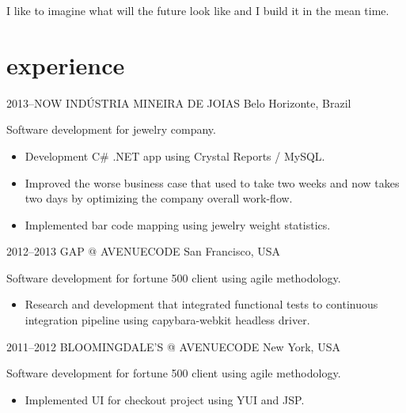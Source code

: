 \documentclass[]{friggeri-cv}
\begin{document}
I like to imagine what will the future look like and I build it in the mean time.

\section{experience}
\begin{entrylist}




\entry
{2013--NOW}
{INDÚSTRIA MINEIRA DE JOIAS}
{Belo Horizonte, Brazil}
{ Software development for jewelry company.

  \begin{itemize}
    \item Development C\# .NET app using  Crystal Reports / MySQL.
    \item Improved the worse business case that used to take two weeks and now takes two days by optimizing the company overall work-flow.
    \item Implemented bar code mapping using jewelry weight statistics.
  \end{itemize}
  }


\entry
{2012--2013}
{GAP @ AVENUECODE}
{San Francisco, USA}
{ Software development for fortune 500 client using agile methodology.
  \begin{itemize}
    \item Research and development that integrated functional tests to continuous integration pipeline using capybara-webkit headless driver.
  \end{itemize}
}


\entry
{2011--2012}
{BLOOMINGDALE'S @ AVENUECODE}
{New York, USA}
{ Software development for fortune 500 client using agile methodology.

  \begin{itemize}
    \item Implemented UI for checkout project using YUI and JSP.
  \end{itemize}
}


\end{entrylist}
\end{document}
